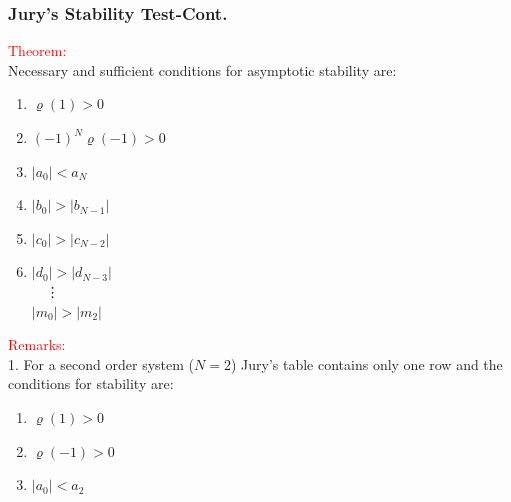 \documentclass[mathserif, 10pt]{beamer} %
\begin{document}
\frame
{
\normalsize

\frametitle{Jury's Stability Test-Cont.}

\textcolor{red}{Theorem:}\\ \vspace{.05in}
Necessary and sufficient conditions for asymptotic stability are:\\
\begin{enumerate}
	\item $\varrho(1)>0$
	\item $(-1)^N \varrho(-1)>0$
	\item $|a_0|<a_N$
	\item $|b_0|>|b_{N-1}|$
	\item $|c_0|>|c_{N-2}|$\\
\item $|d_0|>|d_{N-3}|$\\
	~~\Large\vdots\\
	\normalsize $|m_0|>|m_2|$
\end{enumerate}

\textcolor{red}{Remarks:}\\ \vspace{.05in}
1. For a second order system ($N=2$) Jury's table contains only one row and the conditions for stability are:
\begin{enumerate}
	\item $\varrho(1)>0$
	\item $\varrho(-1)>0$
	\item $|a_0|<a_2$
\end{enumerate}

}
\end{document}
